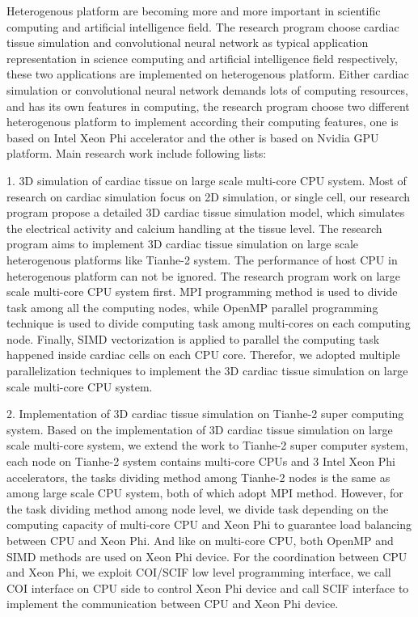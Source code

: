 \begin{eabstract}
Heterogenous platform are becoming more and more important in scientific computing and artificial intelligence field. The research program choose cardiac tissue simulation and convolutional neural network as typical application representation in science computing and artificial intelligence field respectively, these two applications are implemented on heterogenous platform. Either cardiac simulation or convolutional neural network demands lots of computing resources, and has its own features in computing, the research program choose two different heterogenous platform to implement according their computing features, one is based on Intel Xeon Phi accelerator and the other is based on Nvidia GPU platform.  Main research work include following lists:
\begin{compactitem}
\item[1.]3D simulation of cardiac tissue on large scale multi-core CPU system. Most of research on cardiac simulation focus on 2D simulation, or single cell, our research program propose a detailed 3D cardiac tissue simulation model, which simulates the electrical activity and calcium handling at the tissue level. The research program aims to implement 3D cardiac tissue simulation on large scale heterogenous platforms like Tianhe-2 system. The performance of host CPU in heterogenous platform can not be ignored. The research program work on large scale multi-core CPU system first. MPI programming method is used to divide task among all the computing nodes, while OpenMP parallel programming technique is used to divide computing task among multi-cores on each computing node. Finally, SIMD vectorization is applied to parallel the computing task happened inside cardiac cells on each CPU core. Therefor, we adopted multiple parallelization techniques to implement the 3D cardiac tissue simulation on large scale multi-core CPU system.

\item[2.]Implementation of 3D cardiac tissue simulation on Tianhe-2 super computing system. Based on the implementation of 3D cardiac tissue simulation on large scale multi-core system, we extend the work to Tianhe-2 super computer system, each node on Tianhe-2 system contains multi-core CPUs and 3 Intel Xeon Phi accelerators, the tasks dividing method among Tianhe-2 nodes is the same as among large scale CPU system, both of which adopt MPI method. However, for the task dividing method among node level, we divide task depending on the computing capacity of multi-core CPU and Xeon Phi to guarantee load balancing between CPU and Xeon Phi. And like on multi-core CPU, both OpenMP and SIMD methods are used on Xeon Phi device. For the coordination between CPU and Xeon Phi, we exploit COI/SCIF low level programming interface, we call COI interface on CPU side to control Xeon Phi device and call SCIF interface to implement the communication between CPU and Xeon Phi device.


\end{compactitem}
\end{eabstract}
